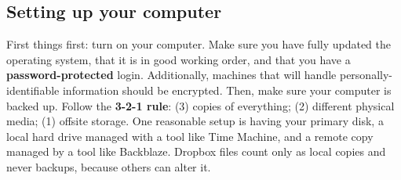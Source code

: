 \subsection{Setting up your computer}

First things first: turn on your computer.
Make sure you have fully updated the operating system,
that it is in good working order,
and that you have a \textbf{password-protected} login. Additionally, machines that will handle personally-identifiable information should be encrypted.
Then, make sure your computer is backed up.
Follow the \textbf{3-2-1 rule}:
(3) copies of everything;
(2) different physical media;
(1) offsite storage. 
One reasonable setup is having your primary disk,
a local hard drive managed with a tool like Time Machine,
and a remote copy managed by a tool like Backblaze.
Dropbox files count only as local copies and never backups,
because others can alter it.


